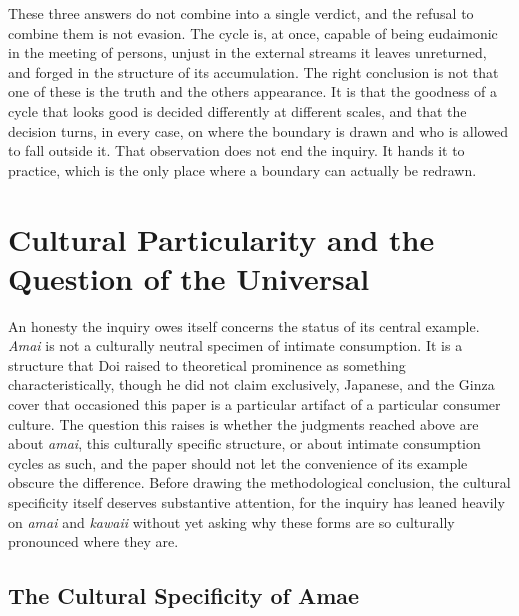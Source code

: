 These three answers do not combine into a single verdict, and the refusal to combine them is not evasion. The cycle is, at once, capable of being eudaimonic in the meeting of persons, unjust in the external streams it leaves unreturned, and forged in the structure of its accumulation. The right conclusion is not that one of these is the truth and the others appearance. It is that the goodness of a cycle that looks good is decided differently at different scales, and that the decision turns, in every case, on where the boundary is drawn and who is allowed to fall outside it. That observation does not end the inquiry. It hands it to practice, which is the only place where a boundary can actually be redrawn.

\section{Cultural Particularity and the Question of the Universal}

An honesty the inquiry owes itself concerns the status of its central example. \textit{Amai} is not a culturally neutral specimen of intimate consumption. It is a structure that Doi raised to theoretical prominence as something characteristically, though he did not claim exclusively, Japanese, and the Ginza cover that occasioned this paper is a particular artifact of a particular consumer culture. The question this raises is whether the judgments reached above are about \textit{amai}, this culturally specific structure, or about intimate consumption cycles as such, and the paper should not let the convenience of its example obscure the difference. Before drawing the methodological conclusion, the cultural specificity itself deserves substantive attention, for the inquiry has leaned heavily on \textit{amai} and \textit{kawaii} without yet asking why these forms are so culturally pronounced where they are.

\subsection{The Cultural Specificity of Amae}

